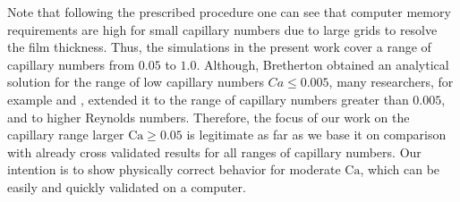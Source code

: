 \documentclass[preprint,12pt]{elsarticle}
\newcommand{\Ca}{\mathrm{Ca}}
\begin{document}
Note that following the prescribed procedure one can see that  computer memory requirements are
high for small capillary numbers due to large grids to resolve the film thickness. Thus, the
simulations in the present work cover a range of capillary numbers from $0.05$ to $1.0$.
Although, Bretherton obtained an analytical solution for the range of low capillary
numbers $Ca \leq 0.005$, many researchers, for example \citet{giavedoni-numerical} and
\citet{heil-bretherton}, extended it to the range of capillary numbers
greater than
$0.005$, and to higher Reynolds numbers. %
Therefore, the focus of our work on the capillary range larger $\Ca\geq0.05$ is legitimate as far
as we base it on comparison with already cross validated
results for all ranges of capillary numbers.  Our intention is
  to show physically correct behavior for moderate $\Ca$,
which
  can be easily and quickly validated on a computer.
\end{document}
